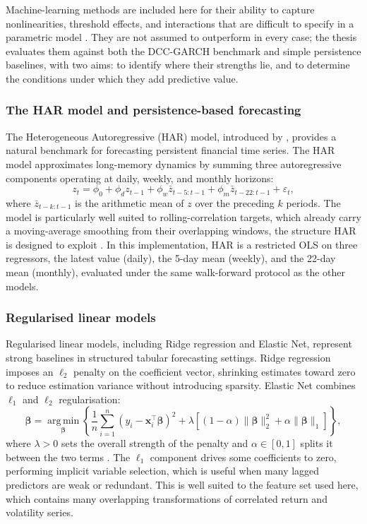 Machine-learning methods are included here for their ability to capture nonlinearities, threshold effects, and interactions that are difficult to specify in a parametric model \cite{gu2020empirical}. They are not assumed to outperform in every case; the thesis evaluates them against both the DCC-GARCH benchmark and simple persistence baselines, with two aims: to identify where their strengths lie, and to determine the conditions under which they add predictive value.

\subsubsection{The HAR model and persistence-based forecasting}

The Heterogeneous Autoregressive (HAR) model, introduced by \textcite{corsi2009har}, provides a natural benchmark for forecasting persistent financial time series. The HAR model approximates long-memory dynamics by summing three autoregressive components operating at daily, weekly, and monthly horizons:
\begin{equation}
    z_t = \phi_0 + \phi_d z_{t-1} + \phi_w \bar{z}_{t-5:t-1}
          + \phi_m \bar{z}_{t-22:t-1} + \varepsilon_t,
\end{equation}
where $\bar{z}_{t-k:t-1}$ is the arithmetic mean of $z$ over the preceding $k$ periods. The model is particularly well suited to rolling-correlation targets, which already carry a moving-average smoothing from their overlapping windows, the structure HAR is designed to exploit \cite{andersen2003realized}. In this implementation, HAR is a restricted OLS on three regressors, the latest value (daily), the 5-day mean (weekly), and the 22-day mean (monthly), evaluated under the same walk-forward protocol as the other models.

\subsubsection{Regularised linear models}

Regularised linear models, including Ridge regression and Elastic Net, represent strong baselines in structured tabular forecasting settings. Ridge regression imposes an $\ell_2$ penalty on the coefficient vector, shrinking estimates toward zero to reduce estimation variance without introducing sparsity. Elastic Net combines $\ell_1$ and $\ell_2$ regularisation:
\begin{equation}
    \hat{\boldsymbol{\beta}} = \operatorname*{arg\,min}_{\boldsymbol{\beta}} \left\{
        \frac{1}{n}\sum_{i=1}^{n}(y_i - \mathbf{x}_i^{\top}\boldsymbol{\beta})^2
        + \lambda \left[(1-\alpha)\|\boldsymbol{\beta}\|_2^2 + \alpha\|\boldsymbol{\beta}\|_1\right]
    \right\},
\end{equation}
where $\lambda > 0$ sets the overall strength of the penalty and $\alpha \in [0,1]$ splits it between the two terms \cite{zou2005}. The $\ell_1$ component drives some coefficients to zero, performing implicit variable selection, which is useful when many lagged predictors are weak or redundant. This is well suited to the feature set used here, which contains many overlapping transformations of correlated return and volatility series.

